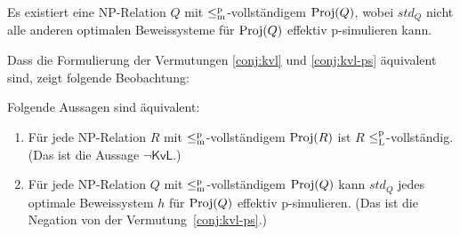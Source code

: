 \begin{conjecture}\label{conj:kvl-ps}
    Es existiert eine NP-Relation $Q$ mit $\leq_\mathrm{m}^\mathrm{p}$-vollständigem $\operatorname{Proj}(Q)$, wobei $\mathit{std}_Q$ nicht alle anderen optimalen Beweissysteme für $\operatorname{Proj}(Q)$ effektiv p-simulieren kann.


\end{conjecture}
Dass die Formulierung der Vermutungen \ref{conj:kvl} und \ref{conj:kvl-ps} äquivalent sind, zeigt folgende Beobachtung:
\begin{observation}\label{obs:kvl-equiv}
    Folgende Aussagen sind äquivalent:
    \begin{enumerate}
        \item Für jede NP-Relation $R$ mit $\leq_\mathrm{m}^\mathrm{p}$-vollständigem $\operatorname{Proj}(R)$ ist $R$ $\leq_\mathrm{L}^\mathrm{p}$-vollständig. (Das ist die Aussage $\neg\mathsf{KvL}$.)
        \item Für jede NP-Relation $Q$ mit $\leq_\mathrm{m}^\mathrm{p}$-vollständigem $\operatorname{Proj}(Q)$ kann $\mathit{std}_Q$ jedes optimale Beweissystem $h$ für $\operatorname{Proj}(Q)$ effektiv p-simulieren. (Das ist die Negation von der Vermutung~\ref{conj:kvl-ps}.)
    \end{enumerate}
\end{observation}
